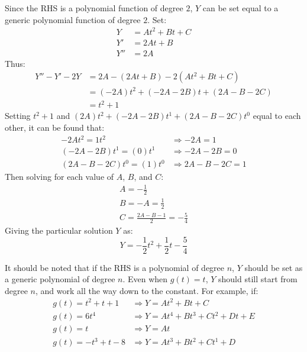 \documentclass[12pt]{article}
\begin{document}
Since the RHS is a polynomial function of degree $2$, $Y$ can be set equal to a generic polynomial function of degree $2$. Set:
\begin{align*}
  Y &= At^2 + Bt + C \\
  Y' &= 2At + B \\
  Y'' &= 2A
\end{align*}
Thus:
\begin{align*}
  Y'' - Y' - 2Y &= 2A - (2At+B) - 2\left(At^2+Bt+C\right) \\
                &= (-2A)t^2 + (-2A-2B)t + (2A - B - 2C) \\
                &= t^2 + 1
\end{align*}
Setting $t^2 + 1$ and $(2A)t^2 + (-2A-2B)t^1 + (2A - B - 2C)t^0$ equal to each other, it can be found that:
\begin{align*}
  -2At^2 = 1t^2         &\Rightarrow -2A = 1 \\
  (-2A-2B)t^1 = (0)t^1  &\Rightarrow -2A-2B = 0 \\
  (2A-B-2C)t^0 = (1)t^0 &\Rightarrow 2A-B-2C = 1
\end{align*}
Then solving for each value of $A$, $B$, and $C$:
\begin{gather*}
  A = -\frac{1}{2} \\
  B = -A = \frac{1}{2} \\
  C = \frac{2A-B-1}{2} = -\frac{5}{4}
\end{gather*}
Giving the particular solution $Y$ as:
\begin{equation*}
  Y = -\frac{1}{2}t^2 + \frac{1}{2}t - \frac{5}{4}
\end{equation*}

It should be noted that if the RHS is a polynomial of degree $n$, $Y$ should be set as a generic polynomial of degree $n$. Even when $g(t) = t$, $Y$ should still start from degree $n$, and work all the way down to the constant. For example, if:
\begin{align*}
  g(t) = t^2 + t + 1  &\Rightarrow Y = At^2 + Bt + C \\
  g(t) = 6t^4         &\Rightarrow Y = At^4 + Bt^3 + Ct^2 + Dt + E \\
  g(t) = t            &\Rightarrow Y = At \\
  g(t) = -t^3 + t - 8 &\Rightarrow Y = At^3 + Bt^2 + Ct^1 + D
\end{align*}
\end{document}
